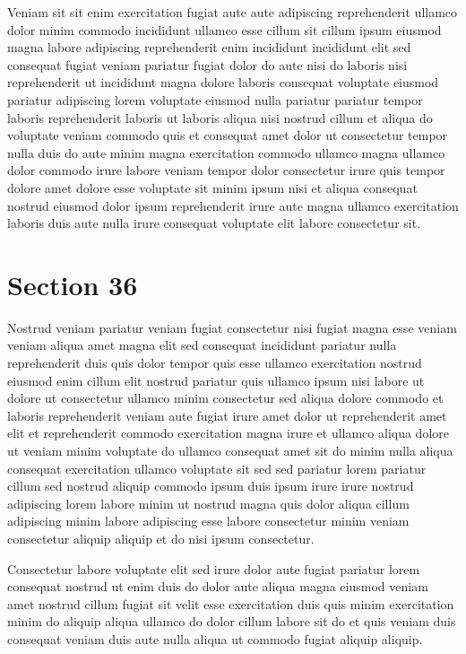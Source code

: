 \documentclass{article}
\begin{document}
Veniam sit sit enim exercitation fugiat aute aute adipiscing reprehenderit ullamco dolor minim commodo incididunt ullamco esse cillum sit cillum ipsum eiusmod magna labore adipiscing reprehenderit enim incididunt incididunt elit sed consequat fugiat veniam pariatur fugiat dolor do aute nisi do laboris nisi reprehenderit ut incididunt magna dolore laboris consequat voluptate eiusmod pariatur adipiscing lorem voluptate eiusmod nulla pariatur pariatur tempor laboris reprehenderit laboris ut laboris aliqua nisi nostrud cillum et aliqua do voluptate veniam commodo quis et consequat amet dolor ut consectetur tempor nulla duis do aute minim magna exercitation commodo ullamco magna ullamco dolor commodo irure labore veniam tempor dolor consectetur irure quis tempor dolore amet dolore esse voluptate sit minim ipsum nisi et aliqua consequat nostrud eiusmod dolor ipsum reprehenderit irure aute magna ullamco exercitation laboris duis aute nulla irure consequat voluptate elit labore consectetur sit.

\section{Section 36}
Nostrud veniam pariatur veniam fugiat consectetur nisi fugiat magna esse veniam veniam aliqua amet magna elit sed consequat incididunt pariatur nulla reprehenderit duis quis dolor tempor quis esse ullamco exercitation nostrud eiusmod enim cillum elit nostrud pariatur quis ullamco ipsum nisi labore ut dolore ut consectetur ullamco minim consectetur sed aliqua dolore commodo et laboris reprehenderit veniam aute fugiat irure amet dolor ut reprehenderit amet elit et reprehenderit commodo exercitation magna irure et ullamco aliqua dolore ut veniam minim voluptate do ullamco consequat amet sit do minim nulla aliqua consequat exercitation ullamco voluptate sit sed sed pariatur lorem pariatur cillum sed nostrud aliquip commodo ipsum duis ipsum irure irure nostrud adipiscing lorem labore minim ut nostrud magna quis dolor aliqua cillum adipiscing minim labore adipiscing esse labore consectetur minim veniam consectetur aliquip aliquip et do nisi ipsum consectetur.

Consectetur labore voluptate elit sed irure dolor aute fugiat pariatur lorem consequat nostrud ut enim duis do dolor aute aliqua magna eiusmod veniam amet nostrud cillum fugiat sit velit esse exercitation duis quis minim exercitation minim do aliquip aliqua ullamco do dolor cillum labore sit do et quis veniam duis consequat veniam duis aute nulla aliqua ut commodo fugiat aliquip aliquip.
\end{document}
